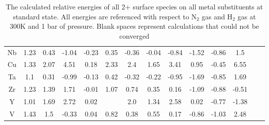 \begin{table}
\begin{center}
\begin{tabular}{| c | c | c | c | c | c | c | c | c | c | c | c | c | c |}
Nb & 1.23 & 0.43 & -1.04 & -0.23 & 0.35 & -0.36 & -0.04 & -0.84 & -1.52 & -0.86 & 1.5 \\
Cu & 1.33 & 2.07 & 4.51 & 0.18 & 2.33 & 2.4 & 1.65 & 3.41 & 0.95 & -0.45 & 6.55 \\
Ta & 1.1 & 0.31 & -0.99 & -0.13 & 0.42 & -0.32 & -0.22 & -0.95 & -1.69 & -0.85 & 1.69 \\
Zr & 1.23 & 1.39 & 1.71 & -0.01 & 1.07 & 0.74 & 0.35 & 0.16 & -1.09 & -0.88 & -0.51 \\
Y & 1.01 & 1.69 & 2.72 & 0.02 &  & 2.0 & 1.34 & 2.58 & 0.02 & -0.77 & -1.38 \\
V & 1.43 & 1.5 & -0.33 & 0.04 & 0.82 & 0.38 & 0.55 & 0.17 & -0.86 & -1.03 & 2.48 \\
\hline
\end{tabular}
\end{center}
\caption{The calculated relative energies of all 2+ surface species on all metal substituents at standard state. All energies are referenced with respect to N$_2$ gas and H$_2$ gas at 300K and 1 bar of pressure. Blank spaces represent calculations that could not be converged}
\label{table:energies}
\end{table}

